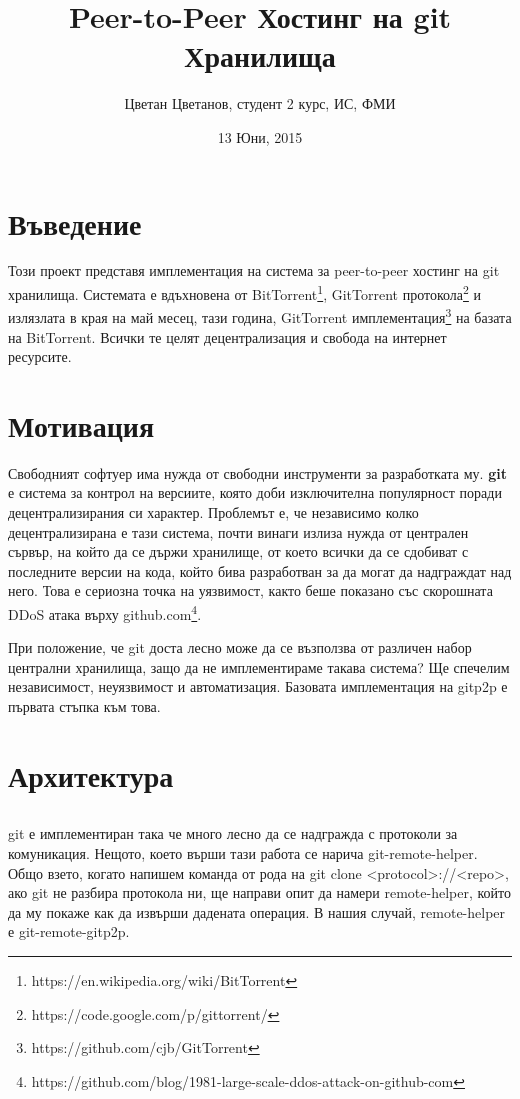 \documentclass[a4paper,12pt]{article}
\title{Peer-to-Peer Хостинг на git Хранилища}
\date{13 Юни, 2015}
\author{Цветан Цветанов, студент 2 курс, ИС, ФМИ}
\begin{document}
\maketitle

\section{Въведение}

Този проект представя имплементация на система за peer-to-peer хостинг на git
хранилища. Системата е вдъхновена от 
BitTorrent\footnote{https://en.wikipedia.org/wiki/BitTorrent}, 
GitTorrent протокола\footnote{https://code.google.com/p/gittorrent/} и 
излязлата в края на май месец, тази година, 
GitTorrent имплементация\footnote{https://github.com/cjb/GitTorrent} на базата
на BitTorrent. Всички те целят децентрализация и свобода на интернет ресурсите.

\section{Мотивация}

Свободният софтуер има нужда от свободни инструменти за разработката му. \textbf{git} е
система за контрол на версиите, която доби изключителна популярност поради
децентрализирания си характер. Проблемът е, че независимо колко децентрализирана
е тази система, почти винаги излиза нужда от централен сървър, на който да се 
държи хранилище, от което всички да се сдобиват с последните версии на кода,
който бива разработван за да могат да надграждат над него. Това е сериозна точка
на уязвимост, както беше показано със скорошната DDoS атака
върху github.com\footnote{https://github.com/blog/1981-large-scale-ddos-attack-on-github-com}.

При положение, че git доста лесно може да се възползва от различен набор централни
хранилища, защо да не имплементираме такава система? Ще спечелим независимост,
неуязвимост и автоматизация. Базовата имплементация на gitp2p е първата стъпка
към това.

\section{Архитектура}

\subsection{}

git е имплементиран така че много лесно да се надгражда с протоколи за 
комуникация. Нещото, което върши тази работа се нарича git-remote-helper. Общо
взето, когато напишем команда от рода на git clone <protocol>://<repo>, ако
git не разбира протокола ни, ще направи опит да намери remote-helper, който да
му покаже как да извърши дадената операция. В нашия случай, remote-helper е
git-remote-gitp2p.
\end{document}
